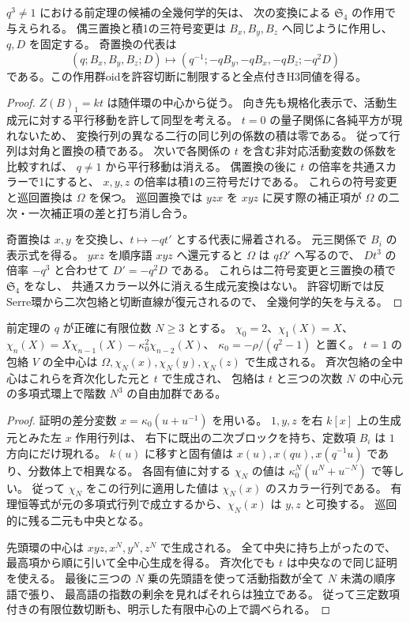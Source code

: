 \begin{proposition}\label{prop:cubic-CY-three-alpha-quantum-triangle-constants-arrows}
$q^3\ne1$ における前定理の候補の全幾何学的矢は、
次の変換による $\mathfrak S_4$ の作用で与えられる。
偶三置換と積1の三符号変更は $B_x,B_y,B_z$ へ同じように作用し、$q,D$ を固定する。
奇置換の代表は
\[
 (q;B_x,B_y,B_z;D)\longmapsto
 (q^{-1};-qB_y,-qB_x,-qB_z;-q^2D)
\]
である。この作用群oidを許容切断に制限すると全点付きH3同値を得る。
\end{proposition}
\begin{proof}
$Z(B)_1=kt$ は随伴環の中心から従う。
向き先も規格化表示で、活動生成元に対する平行移動を許して同型を考える。
$t=0$ の量子関係に各純平方が現れないため、
変換行列の異なる二行の同じ列の係数の積は零である。
従って行列は対角と置換の積である。
次いで各関係の $t$ を含む非対応活動変数の係数を比較すれば、
$q\ne1$ から平行移動は消える。
偶置換の後に $t$ の倍率を共通スカラーで1にすると、
$x,y,z$ の倍率は積1の三符号だけである。
これらの符号変更と巡回置換は $\Omega$ を保つ。
巡回置換では $yzx$ を $xyz$ に戻す際の補正項が
$\Omega$ の二次・一次補正項の差と打ち消し合う。

奇置換は $x,y$ を交換し、$t\mapsto-qt'$ とする代表に帰着される。
元三関係で $B_i$ の表示式を得る。
$yxz$ を順序語 $xyz$ へ還元すると $\Omega$ は $q\Omega'$ へ写るので、
$Dt^3$ の倍率 $-q^3$ と合わせて $D'=-q^2D$ である。
これらは二符号変更と三置換の積で $\mathfrak S_4$ をなし、
共通スカラー以外に消える生成元変換はない。
許容切断では反Serre環から二次包絡と切断直線が復元されるので、
全幾何学的矢を与える。
\end{proof}

\begin{proposition}\label{prop:cubic-CY-three-alpha-quantum-triangle-constants-finite-centre}
前定理の $q$ が正確に有限位数 $N\ge3$ とする。
$\chi_0=2$、$\chi_1(X)=X$、
$\chi_n(X)=X\chi_{n-1}(X)-\kappa_0^2\chi_{n-2}(X)$、
$\kappa_0=-\rho/(q^2-1)$ と置く。
$t=1$ の包絡 $V$ の全中心は
$\Omega,\chi_N(x),\chi_N(y),\chi_N(z)$ で生成される。
斉次包絡の全中心はこれらを斉次化した元と $t$ で生成され、
包絡は $t$ と三つの次数 $N$ の中心元の多項式環上で階数 $N^3$ の自由加群である。
\end{proposition}
\begin{proof}
証明の差分変数 $x=\kappa_0(u+u^{-1})$ を用いる。
$1,y,z$ を右 $k[x]$ 上の生成元とみた左 $x$ 作用行列は、
右下に既出の二次ブロックを持ち、定数項 $B_i$ は
$1$ 方向にだけ現れる。
$k(u)$ に移すと固有値は $x(u),x(qu),x(q^{-1}u)$ であり、分数体上で相異なる。
各固有値に対する $\chi_N$ の値は
$\kappa_0^N(u^N+u^{-N})$ で等しい。
従って $\chi_N$ をこの行列に適用した値は $\chi_N(x)$ のスカラー行列である。
有理恒等式が元の多項式行列で成立するから、$\chi_N(x)$ は $y,z$ と可換する。
巡回的に残る二元も中央となる。

先頭環の中心は $xyz,x^N,y^N,z^N$ で生成される。
全て中央に持ち上がったので、最高項から順に引いて全中心生成を得る。
斉次化でも $t$ は中央なので同じ証明を使える。
最後に三つの $N$ 乗の先頭語を使って活動指数が全て $N$ 未満の順序語で張り、
最高語の指数の剰余を見ればそれらは独立である。
従って三定数項付きの有限位数切断も、明示した有限中心の上で調べられる。
\end{proof}

